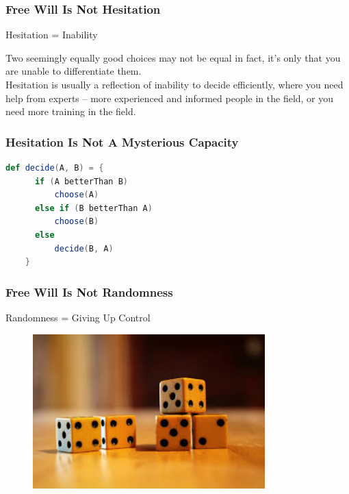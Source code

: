 \documentclass[xcolor=dvipsnames]{beamer}
\theoremstyle{definition}
\begin{document}
\begin{frame}[fragile]
  \frametitle{Free Will Is Not Hesitation}
  \begin{center}
    \alert{\Large{Hesitation = Inability}}\\[0.1cm]
  \end{center}

  Two seemingly equally good choices may not be equal in fact, it's only that you are unable to differentiate them.\\[0.5cm]

  Hesitation is usually a reflection of \alert{inability} to decide efficiently, where you need help from experts -- more experienced and informed people in the field, or you need more training in the field.
\end{frame}

\begin{frame}[fragile]
  \frametitle{Hesitation Is Not A Mysterious Capacity}

  \begin{lstlisting}[language=Scala]
    def decide(A, B) = {
      if (A betterThan B)
          choose(A)
      else if (B betterThan A)
          choose(B)
      else
          decide(B, A)
    }
  \end{lstlisting}
\end{frame}

\begin{frame}[fragile]
  \frametitle{Free Will Is Not Randomness}
  \begin{center}
    \alert{\Large{Randomness = Giving Up Control}}\\[0.1cm]
  \end{center}

  \begin{figure}
    \centering
    \includegraphics[width=0.8\textwidth]{images/dice.jpg}\\
  \end{figure}
\end{frame}
\end{document}
